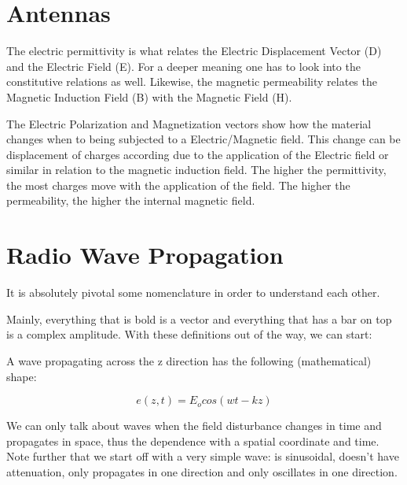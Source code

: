 


\section{Antennas}


The electric permittivity is what relates the Electric Displacement Vector (D) and the Electric Field (E). For a deeper meaning one has to look into the constitutive relations as well.
Likewise, the magnetic permeability relates the Magnetic Induction Field (B) with the Magnetic Field (H).


The Electric Polarization and Magnetization vectors show how the material changes when to being subjected to a Electric/Magnetic field. This change can be displacement of charges according due to the application of the Electric field or similar in relation to the magnetic induction field. The higher the permittivity, the most charges move with the application of the field. The higher the permeability, the higher the internal magnetic field.




\section{Radio Wave Propagation} 

It is absolutely pivotal some nomenclature in order to understand each other.


Mainly, everything that is bold is a vector and everything that has a bar on top is a complex amplitude. With these definitions out of the way, we can start:
\vspace{.5cm}


A wave propagating across the z direction has the following (mathematical) shape:

\begin{equation}
    e(z,t) = E_o cos(wt - kz)
\end{equation}

We can only talk about waves when the field disturbance changes in time and propagates in space, thus the dependence with a spatial coordinate and time. Note further that we start off with a very simple wave: is sinusoidal, doesn't have attenuation, only propagates in one direction and only oscillates in one direction.

